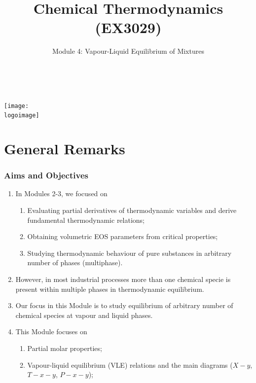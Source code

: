 \documentclass[10pt,compress,unknownkeysallowed]{beamer}
\institute{School of Engineering}
\title{Chemical Thermodynamics (EX3029)}
\subtitle{Module 4: Vapour-Liquid Equilibrium of Mixtures}
\date[ ]{ }
\author[\shortname]{%
  \fullname\\\ttfamily{\emailaddress}
}
\newcommand{\logoimage}{../../FigBanner/UoAHorizBanner}
\begin{document}
\begin{frame}
  \titlepage
  \vfill%
  \begin{center}
    \texttt{[image: \\logoimage]}
  \end{center}
\end{frame}




\section{General Remarks}

\begin{frame}
 \frametitle{Aims and Objectives}
   \begin{enumerate}
     \item<1-> In Modules 2-3, we focused on 
       \begin{enumerate}
         \item<1-> Evaluating partial derivatives of thermodynamic variables and derive fundamental thermodynamic relations;
         \item<1-> Obtaining volumetric EOS parameters from critical properties;
         \item<1-> Studying thermodynamic behaviour of pure substances in arbitrary number of phases (multiphase).
       \end{enumerate} 
     \item<2-> However, in most industrial processes more than one chemical specie is present within multiple phases in thermodynamic equilibrium. 
     \item<3-> Our focus in this Module is to study equilibrium of arbitrary number of chemical species at vapour and liquid phases.
     \item<4-> This Module focuses on 
         \begin{enumerate}
           \item<4-> Partial molar properties; 
           \item<4-> Vapour-liquid equilibrium (VLE) relations and the main diagrams ($X-y$, $T-x-y$, $P-x-y$); 
         \end{enumerate}
   \end{enumerate}
\end{frame}
\end{document}
